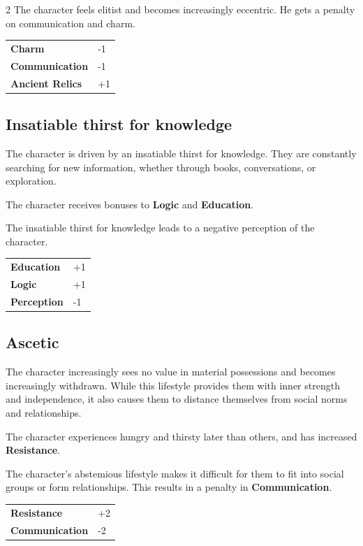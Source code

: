 \begin{multicols}{2}
    The character feels elitist and becomes increasingly eccentric. He gets a penalty on communication and charm.

    \begin{tabular}{@{}ll@{}}
        \textbf{Charm} & -1\\
        \textbf{Communication} & -1\\
        \textbf{Ancient Relics} & +1\\
    \end{tabular}

    \subsection*{Insatiable thirst for knowledge}

    The character is driven by an insatiable thirst for knowledge. They are constantly searching for new information, whether through books, conversations, or exploration.

    The character receives bonuses to \textbf{Logic} and \textbf{Education}.

    The insatiable thirst for knowledge leads to a negative perception of the character.

    \begin{tabular}{@{}ll@{}}
        \textbf{Education} & +1\\
        \textbf{Logic} & +1\\
        \textbf{Perception} & -1\\
    \end{tabular}

    \subsection*{Ascetic}

    The character increasingly sees no value in material possessions and becomes increasingly withdrawn. While this lifestyle provides them with inner strength and independence, it also causes them to distance themselves from social norms and relationships.

    The character experiences hungry and thirsty later than others, and has increased \textbf{Resistance}.

    The character's abstemious lifestyle makes it difficult for them to fit into social groups or form relationships. This results in a penalty in \textbf{Communication}.

    \begin{tabular}{@{}ll@{}}
        \textbf{Resistance} & +2\\
        \textbf{Communication} & -2\\
    \end{tabular}


\end{multicols}
